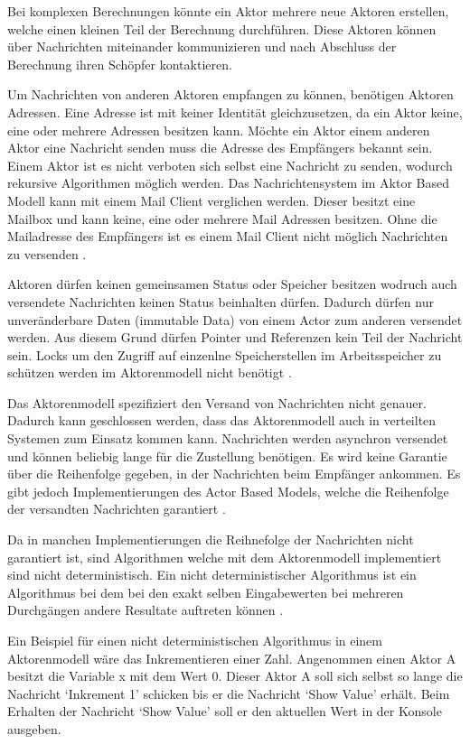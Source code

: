 Bei komplexen Berechnungen könnte ein Aktor mehrere neue Aktoren erstellen, welche einen kleinen Teil der Berechnung durchführen. Diese Aktoren können über Nachrichten miteinander kommunizieren und nach Abschluss der Berechnung ihren Schöpfer kontaktieren. 

Um Nachrichten von anderen Aktoren empfangen zu können, benötigen Aktoren Adressen. Eine Adresse ist mit keiner Identität gleichzusetzen, da ein Aktor keine, eine oder mehrere Adressen besitzen kann. Möchte ein Aktor einem anderen Aktor eine Nachricht senden muss die Adresse des Empfängers bekannt sein. Einem Aktor ist es nicht verboten sich selbst eine Nachricht zu senden, wodurch rekursive Algorithmen möglich werden. Das Nachrichtensystem im Aktor Based Modell kann mit einem Mail Client verglichen werden. Dieser besitzt eine Mailbox und kann keine, eine oder mehrere Mail Adressen besitzen. Ohne die Mailadresse des Empfängers ist es einem Mail Client nicht möglich Nachrichten zu versenden \cite[p. 85]{Erb2012}. 

Aktoren dürfen keinen gemeinsamen Status oder Speicher besitzen wodruch auch versendete Nachrichten keinen Status beinhalten dürfen. Dadurch dürfen nur unveränderbare Daten (immutable Data) von einem Actor zum anderen versendet werden. Aus diesem Grund dürfen Pointer und Referenzen kein Teil der Nachricht sein. Locks um den Zugriff auf einzenlne Speicherstellen im Arbeitsspeicher zu schützen werden im Aktorenmodell nicht benötigt \cite[p. 85]{Erb2012}.

Das Aktorenmodell spezifiziert den Versand von Nachrichten nicht genauer. Dadurch kann geschlossen werden, dass das Aktorenmodell auch in verteilten Systemen zum Einsatz kommen kann. Nachrichten werden asynchron versendet und können beliebig lange für die Zustellung benötigen. Es wird keine Garantie über die Reihenfolge gegeben, in der Nachrichten beim Empfänger ankommen. Es gibt jedoch Implementierungen des Actor Based Models, welche die Reihenfolge der versandten Nachrichten garantiert \cite[p. 85]{Erb2012}.

Da in manchen Implementierungen die Reihnefolge der Nachrichten nicht garantiert ist, sind Algorithmen welche mit dem Aktorenmodell implementiert sind nicht deterministisch. Ein nicht deterministischer Algorithmus ist ein Algorithmus bei dem bei den exakt selben Eingabewerten bei mehreren Durchgängen andere Resultate auftreten können \cite[]{Agh85}. 

Ein Beispiel für einen nicht deterministischen Algorithmus in einem Aktorenmodell wäre das Inkrementieren einer Zahl. Angenommen einen Aktor A besitzt die Variable x mit dem Wert 0. Dieser Aktor A soll sich selbst so lange die Nachricht `Inkrement 1' schicken bis er die Nachricht `Show Value' erhält. Beim Erhalten der Nachricht `Show Value' soll er den aktuellen Wert in der Konsole ausgeben.

